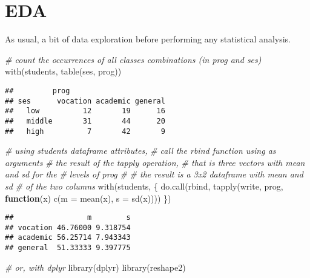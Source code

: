 \documentclass[
  oneside]{book}
\newenvironment{Shaded}{\begin{snugshade}}{\end{snugshade}}
\newcommand{\AttributeTok}[1]{\textcolor[rgb]{0.77,0.63,0.00}{#1}}
\newcommand{\CommentTok}[1]{\textcolor[rgb]{0.56,0.35,0.01}{\textit{#1}}}
\newcommand{\ControlFlowTok}[1]{\textcolor[rgb]{0.13,0.29,0.53}{\textbf{#1}}}
\newcommand{\FunctionTok}[1]{\textcolor[rgb]{0.00,0.00,0.00}{#1}}
\newcommand{\NormalTok}[1]{#1}
\begin{document}
\hypertarget{eda}{%
\section{EDA}\label{eda}}

As usual, a bit of data exploration before performing any statistical
analysis.

\begin{Shaded}
\begin{Highlighting}[]
\CommentTok{\# count the occurrences of all classes combinations (in prog and ses)}
\FunctionTok{with}\NormalTok{(students, }\FunctionTok{table}\NormalTok{(ses, prog))}
\end{Highlighting}
\end{Shaded}

\begin{verbatim}
##         prog
## ses      vocation academic general
##   low          12       19      16
##   middle       31       44      20
##   high          7       42       9
\end{verbatim}

\begin{Shaded}
\begin{Highlighting}[]
\CommentTok{\# using students dataframe attributes,}
\CommentTok{\# call the rbind function using as arguments}
\CommentTok{\# the result of the tapply operation,}
\CommentTok{\# that is three vectors with mean and sd for the}
\CommentTok{\# levels of \textasciigrave{}prog\textasciigrave{}}
\CommentTok{\#}
\CommentTok{\# the result is a 3x2 dataframe with mean and sd}
\CommentTok{\# of the two columns}
\FunctionTok{with}\NormalTok{(students, \{}
       \FunctionTok{do.call}\NormalTok{(rbind, }\FunctionTok{tapply}\NormalTok{(write, prog, }
                             \ControlFlowTok{function}\NormalTok{(x) }\FunctionTok{c}\NormalTok{(}\AttributeTok{m =} \FunctionTok{mean}\NormalTok{(x), }\AttributeTok{s =} \FunctionTok{sd}\NormalTok{(x))))}
\NormalTok{\})}
\end{Highlighting}
\end{Shaded}

\begin{verbatim}
##                 m        s
## vocation 46.76000 9.318754
## academic 56.25714 7.943343
## general  51.33333 9.397775
\end{verbatim}

\begin{Shaded}
\begin{Highlighting}[]
\CommentTok{\# or, with dplyr}
\FunctionTok{library}\NormalTok{(dplyr)}
\FunctionTok{library}\NormalTok{(reshape2)}
\end{Highlighting}
\end{Shaded}
\end{document}
